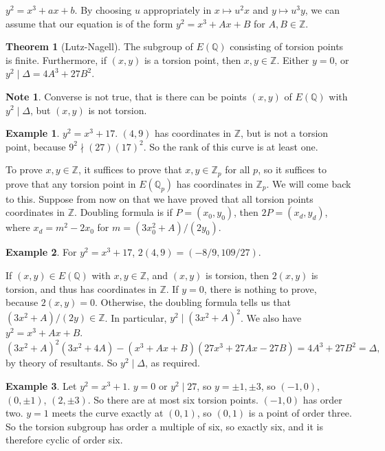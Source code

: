 \documentclass{article}
\newcommand{\Z}{\mathbb{Z}}
\newcommand{\Q}{\mathbb{Q}}
\newcommand{\rb}[1]{\left( #1 \right)}
\theoremstyle{definition}\newtheorem{definition}{Definition}[section]
\theoremstyle{definition}\newtheorem{remark}[definition]{Remark}
\theoremstyle{definition}\newtheorem*{example}{Example}
\theoremstyle{definition}\newtheorem*{note}{Note}
\newtheorem{theorem}[definition]{Theorem}
\begin{document}
$ y^2 = x^3 + ax + b $. By choosing $ u $ appropriately in $ x \mapsto u^2x $ and $ y \mapsto u^3y $, we can assume that our equation is of the form $ y^2 = x^3 + Ax + B $ for $ A, B \in \Z $.

\begin{theorem}[Lutz-Nagell]
The subgroup of $ E\rb{\Q} $ consisting of torsion points is finite. Furthermore, if $ \rb{x, y} $ is a torsion point, then $ x, y \in \Z $. Either $ y = 0 $, or $ y^2 \mid \Delta = 4A^3 + 27B^2 $.
\end{theorem}

\begin{note}
Converse is not true, that is there can be points $ \rb{x, y} $ of $ E\rb{\Q} $ with $ y^2 \mid \Delta $, but $ \rb{x, y} $ is not torsion.
\end{note}

\begin{example}
$ y^2 = x^3 + 17 $. $ \rb{4, 9} $ has coordinates in $ \Z $, but is not a torsion point, because $ 9^2 \nmid \rb{27}\rb{17}^2 $. So the rank of this curve is at least one.
\end{example}

To prove $ x, y \in \Z $, it suffices to prove that $ x, y \in \Z_p $ for all $ p $, so it suffices to prove that any torsion point in $ E\rb{\Q_p} $ has coordinates in $ \Z_p $. We will come back to this. Suppose from now on that we have proved that all torsion points coordinates in $ \Z $. Doubling formula is if $ P = \rb{x_0, y_0} $, then $ 2P = \rb{x_d, y_d} $, where $ x_d = m^2 - 2x_0 $ for $ m = \rb{3x_0^2 + A} / \rb{2y_0} $.

\begin{example}
For $ y^2 = x^3 + 17 $, $ 2\rb{4, 9} = \rb{-8 / 9, 109 / 27} $.
\end{example}

If $ \rb{x, y} \in E\rb{\Q} $ with $ x, y \in \Z $, and $ \rb{x, y} $ is torsion, then $ 2\rb{x, y} $ is torsion, and thus has coordinates in $ \Z $. If $ y = 0 $, there is nothing to prove, because $ 2\rb{x, y} = 0 $. Otherwise, the doubling formula tells us that $ \rb{3x^2 + A} / \rb{2y} \in \Z $. In particular, $ y^2 \mid \rb{3x^2 + A}^2 $. We also have $ y^2 = x^3 + Ax + B $.
$$ \rb{3x^2 + A}^2\rb{3x^2 + 4A} - \rb{x^3 + Ax + B}\rb{27x^3 + 27Ax - 27B} = 4A^3 + 27B^2 = \Delta, $$
by theory of resultants. So $ y^2 \mid \Delta $, as required.

\begin{example}
Let $ y^2 = x^3 + 1 $. $ y = 0 $ or $ y^2 \mid 27 $, so $ y = \pm 1, \pm 3 $, so $ \rb{-1, 0} $, $ \rb{0, \pm 1} $, $ \rb{2, \pm 3} $. So there are at most six torsion points. $ \rb{-1, 0} $ has order two. $ y = 1 $ meets the curve exactly at $ \rb{0, 1} $, so $ \rb{0, 1} $ is a point of order three. So the torsion subgroup has order a multiple of six, so exactly six, and it is therefore cyclic of order six.
\end{example}
\end{document}
